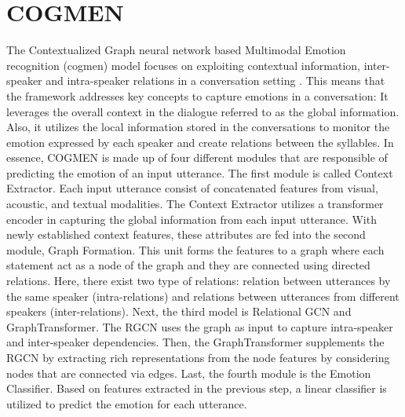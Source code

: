 \section{COGMEN}
\label{sec:COGMEN}
The Contextualized Graph neural network based Multimodal Emotion recognition (\acrshort{cogmen}) model focuses on exploiting contextual information, inter-speaker and intra-speaker relations in a conversation setting \cite{COGMEN_joshi-etal-2022-cogmen}. This means that the framework addresses key concepts to capture emotions in a conversation: It leverages the overall context in the dialogue referred to as the global information. Also, it utilizes the local information stored in the conversations to monitor the emotion expressed by each speaker and create relations between the syllables. In essence, COGMEN is made up of four different modules that are responsible of predicting the emotion of an input utterance. The first module is called Context Extractor. Each input utterance consist of concatenated features from visual, acoustic, and textual modalities. The Context Extractor utilizes a transformer encoder in capturing the global information from each input utterance. With newly established context features, these attributes are fed into the second module, Graph Formation. This unit forms the features to a graph where each statement act as a node of the graph and they are connected using directed relations. Here, there exist two type of relations: relation between utterances by the same speaker (intra-relations) and relations between utterances from different speakers (inter-relations). Next, the third model is Relational GCN and GraphTransformer. The RGCN uses the graph as input to capture intra-speaker and inter-speaker dependencies. Then, the GraphTransformer supplements the RGCN by extracting rich representations from the node features by considering nodes that are connected via edges. Last, the fourth module is the Emotion Classifier. Based on features extracted in the previous step, a linear classifier is utilized to predict the emotion for each utterance.

